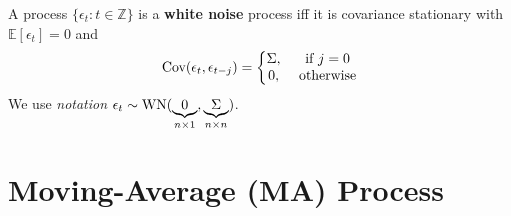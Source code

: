 \documentclass[11pt]{elegantbook}
\begin{document}
\begin{definition}
    A process $\{\epsilon_t:t\in \mathbb{Z}\}$ is a \textbf{white noise} process iff it is covariance stationary with $\mathbb{E}[\epsilon_t]=0$ and
    \begin{equation}
        \begin{aligned}
            \textnormal{Cov}(\epsilon_t,\epsilon_{t-j})=\left\{\begin{matrix}
                \Sigma,& \textnormal{ if }j=0\\
                0,& \textnormal{ otherwise}
            \end{matrix}\right.
        \end{aligned}
        \nonumber
    \end{equation}
    We use \textit{notation} $\epsilon_t\sim \textnormal{WN}(\underbrace{0}_{n\times 1},\underbrace{\Sigma}_{n\times n})$.
\end{definition}


\chapter{Moving-Average (MA) Process}
\end{document}
